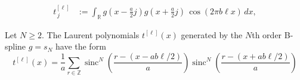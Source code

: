 \documentclass[10pt,a4paper]{amsart}
\DeclareMathOperator{\sinc}{sinc}
\begin{document}
\begin{align}
    t^{[\ell]}_{\,j} &:= \int_{\mathbb{R}} g\left(x - \tfrac{a}{2} j\right) g\left(x + \tfrac{a}{2} j\right)\, \cos(2\pi b\ell x) \, dx, \label{eq:tjl}
\end{align}

\begin{theorem} \label{thm:tl_sinc}
Let $N\geq2$. The Laurent polynomials $t^{[\ell]}(x)$ generated by the $N$th order
  B-spline $g=s_N$ have the form
  \begin{equation}
  t^{[\ell]}(x) = \frac{1}{a} \sum_{r \in \mathbb{Z}}
    \sinc^N\!\left(\frac{r - (x - ab\ell/2)}{a}\right)
	\sinc^N\!\left(\frac{r - (x + ab\ell/2)}{a}\right)
	\label{eq:tl_sinc}
  \end{equation}
\end{theorem}
\end{document}
